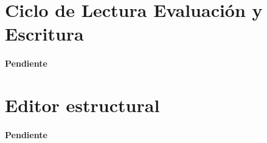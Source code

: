 \documentclass[letterpaper,twoside,openright,11pt]{book}
\begin{document}
\nwenddocs{}\section*{Ciclo de Lectura Evaluación y Escritura}

\paragraph{Pendiente}

\nwenddocs{}\section*{Editor estructural}

\paragraph{Pendiente}

\nwenddocs{}
\end{document}
